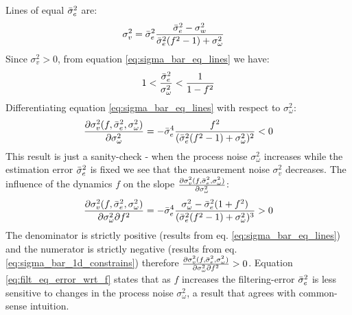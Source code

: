 \documentclass[oneside,12pt]{article}
\begin{document}
Lines of equal $\Bar{\sigma}_e^2$ are:  
%
\begin{equation}\label{eq:sigma_bar_eq_lines}
    \begin{split}
        \sigma_v^2 &= \Bar{\sigma}_e^2 \frac{\Bar{\sigma}_e^2 - \sigma_w^2}{\Bar{\sigma}_e^2(f^2-1) + \sigma_\omega^2}
    \end{split}
\end{equation}
%
Since $\sigma_v^2 > 0$, from equation \ref{eq:sigma_bar_eq_lines} we have:
\begin{equation}\label{eq:sigma_bar_1d_constrains}
    1 < \frac{\Bar{\sigma}_e^2}{\sigma_\omega^2} < \frac{1}{1-f^2}
\end{equation}
%
Differentiating equation \ref{eq:sigma_bar_eq_lines} with respect to $\sigma_\omega^2$:
%
\begin{equation}
    \frac{\partial \sigma_v^2(f,\Bar{\sigma}_e^2,\sigma_\omega^2)}{\partial \sigma_\omega^2} = -\Bar{\sigma}_e^4 \frac{f^2}{(\Bar{\sigma}_e^2(f^2-1) + \sigma_\omega^2)^2} < 0
\end{equation}
%
This result is just a sanity-check - when the process noise $\sigma_\omega^2$ increases while the estimation error $\Bar{\sigma}_e^2$ is fixed we see that the measurement noise $\sigma_v^2$ decreases. The influence of the dynamics $f$ on the slope $\frac{\partial \sigma_v^2(f,\Bar{\sigma}_e^2,\sigma_\omega^2)}{\partial \sigma_\omega^2}$:
%
\begin{equation}\label{eq:filt_eq_error_wrt_f}
    \frac{\partial \sigma_v^2(f,\Bar{\sigma}_e^2,\sigma_\omega^2)}{\partial \sigma_\omega^2 \partial f^2} = -\Bar{\sigma}_e^4 \frac{\sigma_\omega^2 - \Bar{\sigma}_e^2(1+f^2)}{(\Bar{\sigma}_e^2(f^2-1) + \sigma_\omega^2)^3} > 0
\end{equation}
%
The denominator is strictly positive (results from eq. \ref{eq:sigma_bar_eq_lines}) and the numerator is strictly negative (results from eq. \ref{eq:sigma_bar_1d_constrains}) therefore $\frac{\partial \sigma_v^2(f,\Bar{\sigma}_e^2,\sigma_\omega^2)}{\partial \sigma_\omega^2 \partial f^2}>0$. Equation \ref{eq:filt_eq_error_wrt_f} states that as $f$ increases the filtering-error $\Bar{\sigma}_e^2$ is less sensitive to changes in the process noise $\sigma_\omega^2$, a result that agrees with common-sense intuition.\\\\
%
\end{document}
